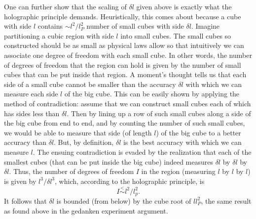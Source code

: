 \documentclass[a4paper]{jpconf}
\begin{document}
One can further show that the scaling of $\delta l$ given above is exactly 
what
the holographic principle \cite{holography,Susskind} demands.
Heuristically, this comes about because a cube with side $l$ contains $\sim
l^2/l_P^2$ number
of small cubes with side $\delta l$. \cite{ngvd00}
Imagine partitioning a cubic region with side $l$ into small cubes. 
The small cubes so constructed should
be as small as physical laws allow so that intuitively we can associate
one degree of
freedom with each small cube.   In other words, the number of
degrees of freedom that the region can hold is given by the number of
small
cubes that can be put inside that region.
A moment's thought tells us that each side of a small cube
cannot be smaller than the accuracy
$\delta l$ with which we can measure each side $l$ of the big cube.
This can be easily shown by applying the method of contradiction:  assume
that we can construct small cubes each of which has sides less than
$\delta l$.  
Then by lining up a row of such small cubes along a side of  
the big cube from end to end, and by counting the number of such small
cubes,
we would be able
to measure that side (of length $l$) of the big cube
to a better accuracy than $\delta l$.  But, by
definition, $\delta l$ is the best accuracy with which we can measure
$l$.  The
ensuing contradiction is evaded by the realization that each of the
smallest
cubes (that can be put inside the big cube)
indeed measures $\delta l$ by
$\delta l$ by
$\delta l$.  Thus, the number of degrees of freedom $I$ in the region
(measuring $l$ by $l$ by $l$) is given by $l^3 / \delta l^3$,
which,
according to the holographic principle, is  
\begin{equation}
I \stackrel{<}{\sim} l^2 / l_p^2.
\end{equation}
\label{holog}
It follows
that $\delta l$  is bounded (from below) by the cube root of $l l_P^2$,
the same result as found
above in the gedanken experiment argument.\\
\end{document}
